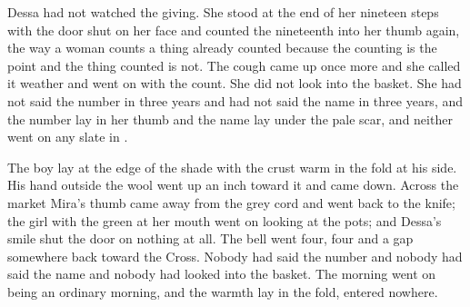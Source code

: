 Dessa had not watched the giving. She stood at the end of her nineteen steps with the door shut on her face and counted the nineteenth into her thumb again, the way a woman counts a thing already counted because the counting is the point and the thing counted is not. The cough came up once more and she called it weather and went on with the count. She did not look into the basket. She had not said the number in three years and had not said the name in three years, and the number lay in her thumb and the name lay under the pale scar, and neither went on any slate in .

The boy lay at the edge of the shade with the crust warm in the fold at his side. His hand outside the wool went up an inch toward it and came down. Across the market Mira's thumb came away from the grey cord and went back to the knife; the girl with the green at her mouth went on looking at the pots; and Dessa's smile shut the door on nothing at all. The bell went four, four and a gap somewhere back toward the Cross. Nobody had said the number and nobody had said the name and nobody had looked into the basket. The morning went on being an ordinary morning, and the warmth lay in the fold, entered nowhere.
